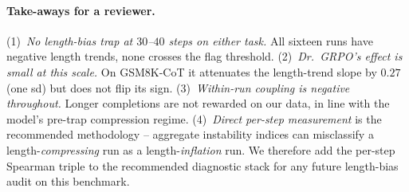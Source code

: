 \begin{table}[htbp]
\centering
\small
{}
\caption{Cross-horizon reconciliation. At short horizons the model compresses under
reinforcement; at long horizons Dr.~GRPO's authors observe the predicted length growth
followed by reward collapse. Our data is consistent with the early phase of the
Dr.~GRPO curve, not the late phase.}
\label{tab:length-bias-horizon}
\end{table}

\paragraph{Take-aways for a reviewer.}
(1)~\emph{No length-bias trap at $30$--$40$ steps on either task.}
All sixteen runs have negative length trends, none crosses the
flag threshold. (2)~\emph{Dr.~GRPO's effect is small at this scale.}
On GSM8K-CoT it attenuates the length-trend slope by $0.27$ (one
sd) but does not flip its sign. (3)~\emph{Within-run coupling is
negative throughout.} Longer completions are not rewarded on our
data, in line with the model's pre-trap compression regime.
(4)~\emph{Direct per-step measurement} is the recommended
methodology -- aggregate instability indices can misclassify a
length-\emph{compressing} run as a length-\emph{inflation} run.
We therefore add the per-step Spearman triple to the recommended
diagnostic stack for any future length-bias audit on this benchmark.

\endinput %
\subsection{Elevated analysis: trap-onset detection, paired bootstrap CIs, decile binned coupling, and a 100-step cross-validation}
\label{sec:length-bias-elevated}

